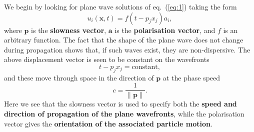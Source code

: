 We begin by looking for plane wave solutions of eq.~(\ref{eq:1}) taking the form
\begin{equation}
u_{i}(\mathbf{x},t)=f(t-p_{j}x_{j})a_{i},
\label{eq:2}
\end{equation}
where $\mathbf{p}$ is the \textbf{slowness vector}, $\mathbf{a}$ is the \textbf{polarisation vector}, and $f$ is an arbitrary function. 
The fact that the shape of the plane wave does 
not change during propagation shows that, if such waves exist, they are non-dispersive. The above displacement vector is seen to be 
constant on the wavefronts
\begin{equation}
t-p_{j}x_{j}=\text{constant},
\label{eq:3}
\end{equation}
and these move through space in the direction of $\mathbf{p}$ at the phase speed
\begin{equation}
c=\frac{1}{\|\mathbf{p}\|}.
\label{eq:4}
\end{equation}
Here we see that the slowness vector is used to specify both the \textbf{speed and direction of propagation of the plane wavefronts}, 
while the polarisation vector gives the \textbf{orientation of the associated particle motion}.
 
